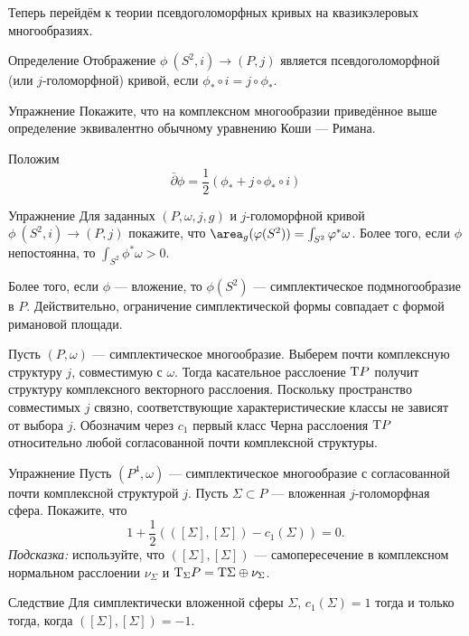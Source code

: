 Теперь перейдём к теории псевдоголоморфных кривых на квазикэлеровых многообразиях.

\begin{ex*}{Определение}
Отображение $\phi\:(S^2, i) \to (P, j)$ является псевдоголоморфной
(или $j$-голоморфной) кривой, если  
$\phi_\ast \circ i = j \circ \phi_\ast$.
\end{ex*}

\begin{ex}{Упражнение}\label{10.2.D}
Покажите, что на комплексном многообразии приведённое выше определение
эквивалентно обычному уравнению Коши — Римана.
\end{ex}

Положим 
\[\bar\partial\phi=\frac12(\phi_\ast+j\circ\phi_\ast\circ i)\]

\begin{ex}[(ср. \ref{4.1.A})]{Упражнение}\label{10.2.E}
Для заданных $(P, \omega, j, g)$ и $j$-го\-ло\-морф\-ной кривой $\phi
\: (S^2, i) \to (P, j)$ покажите, что $\area_g (\phi(S^2)) \z=
\int_{S^2}\phi^\ast \omega$. 
Более того, если $\phi$ непостоянна, то $\int_{S^2} \phi^\ast \omega
> 0$.  
\end{ex}

Более того, если $\phi$ — вложение, то $\phi(S^2)$ —
симплектическое подмногообразие в $P$. 
Действительно, ограничение симплектической формы совпадает с формой
римановой площади. 

Пусть $(P, \omega)$ — симплектическое многообразие.
Выберем почти комплексную структуру $j$, совместимую с $\omega$.
Тогда касательное расслоение $\mathrm{T} P$ получит структуру комплексного
векторного расслоения. 
Поскольку пространство совместимых $j$ связно, соответствующие
характеристические классы не зависят от выбора $j$. 
Обозначим через $c_1$ первый класс Черна расслоения $\mathrm{T} P$
относительно любой согласованной почти комплексной структуры. 

\begin{ex}{Упражнение}\label{10.2.F}
Пусть $(P^4, \omega)$ — симплектическое многообразие с согласованной
почти комплексной структурой $j$. 
Пусть $\Sigma \subset P$ — вложенная $j$-голоморфная сфера.
Покажите, что
\[1 +\frac12 (([\Sigma], [\Sigma]) - c_1 (\Sigma)) = 0.\]
\emph{Подсказка:} используйте, что $([\Sigma], [\Sigma])$ —
самопересечение в комплексном нормальном расслоении $\nu_\Sigma$ и
$\mathrm{T}_\Sigma P = \mathrm{T}\Sigma \oplus \nu_\Sigma$. 
\end{ex}


\begin{thm*}{Следствие} Для симплектически вложенной сферы $\Sigma$,
   $c_1(\Sigma) = 1$ тогда и только тогда, когда $([\Sigma], [\Sigma]) = -1$. 
\end{thm*}

